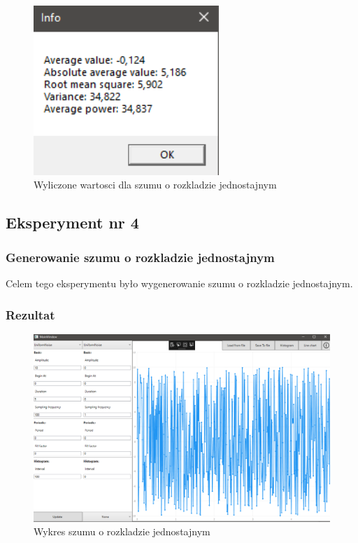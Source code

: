 \documentclass[12pt]{article}
\begin{document}
\begin{figure}[H]
 \centering
 \includegraphics[width=7cm]{images/uni1info.PNG}
 \vspace{-0.3cm}
 \caption{Wyliczone wartosci dla szumu o rozkladzie jednostajnym}
 \label{gui}
\end{figure}



\subsection{Eksperyment nr 4 }
\subsubsection{Generowanie szumu o rozkladzie jednostajnym}
Celem tego eksperymentu było wygenerowanie szumu o rozkladzie jednostajnym.


\subsubsection{Rezultat}

\begin{figure}[H]
 \centering
 \includegraphics[width=14cm]{images/uni1.PNG}
 \vspace{-0.3cm}
 \caption{Wykres szumu o rozkladzie jednostajnym}
 \label{gui}
\end{figure}
\end{document}
